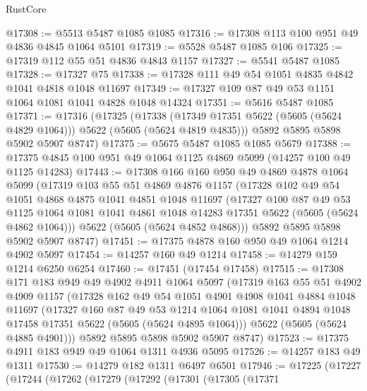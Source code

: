 \begin{lexlean}{RustCore}
\begin{coremodule}
@17308 := @5513 @5487 @1085 @1085
@17316 := @17308 @113 @100 @951 @49 @4836 @4845 @1064 @5101
@17319 := @5528 @5487 @1085 @106
@17325 := @17319 @112 @55 @51 @4836 @4843 @1157
@17327 := @5541 @5487 @1085
@17328 := @17327 @75
@17338 := @17328 @111 @49 @54 @1051 @4835 @4842 @1041 @4818 @1048 @11697
@17349 := @17327 @109 @87 @49 @53 @1151 @1064 @1081 @1041 @4828 @1048 @14324
@17351 := @5616 @5487 @1085
@17371 := @17316
    (@17325
      (@17338 (@17349 @17351 @5622 (@5605 (@5624 @4829 @1064))) @5622 (@5605 (@5624 @4819 @4835)))
      @5892
      @5895
      @5898
      @5902
      @5907
      @8747)
@17375 := @5675 @5487 @1085 @1085 @5679
@17388 := @17375 @4845 @100 @951 @49 @1064 @1125 @4869 @5099 (@14257 @100 @49 @1125 @14283)
@17443 := @17308
    @166
    @160
    @950
    @49
    @4869
    @4878
    @1064
    @5099
    (@17319
      @103
      @55
      @51
      @4869
      @4876
      @1157
      (@17328
        @102
        @49
        @54
        @1051
        @4868
        @4875
        @1041
        @4851
        @1048
        @11697
        (@17327
          @100
          @87
          @49
          @53
          @1125
          @1064
          @1081
          @1041
          @4861
          @1048
          @14283
          @17351
          @5622
          (@5605 (@5624 @4862 @1064)))
        @5622
        (@5605 (@5624 @4852 @4868)))
      @5892
      @5895
      @5898
      @5902
      @5907
      @8747)
@17451 := @17375 @4878 @160 @950 @49 @1064 @1214 @4902 @5097
@17454 := @14257 @160 @49 @1214
@17458 := @14279 @159 @1214 @6250 @6254
@17460 := @17451 (@17454 @17458)
@17515 := @17308
    @171
    @183
    @949
    @49
    @4902
    @4911
    @1064
    @5097
    (@17319
      @163
      @55
      @51
      @4902
      @4909
      @1157
      (@17328
        @162
        @49
        @54
        @1051
        @4901
        @4908
        @1041
        @4884
        @1048
        @11697
        (@17327
          @160
          @87
          @49
          @53
          @1214
          @1064
          @1081
          @1041
          @4894
          @1048
          @17458
          @17351
          @5622
          (@5605 (@5624 @4895 @1064)))
        @5622
        (@5605 (@5624 @4885 @4901)))
      @5892
      @5895
      @5898
      @5902
      @5907
      @8747)
@17523 := @17375 @4911 @183 @949 @49 @1064 @1311 @4936 @5095
@17526 := @14257 @183 @49 @1311
@17530 := @14279 @182 @1311 @6497 @6501
@17946 := @17225
    (@17227
      (@17244
        (@17262
          (@17279
            (@17292
              (@17301
                (@17305
                  (@17371

\end{coremodule}
\end{lexlean}
